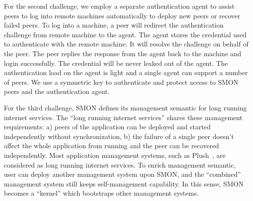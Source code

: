 
For the second challenge, we employ a separate
authentication agent to assist peers to log into remote
machines automatically to deploy new peers or recover failed
peers. To log into a machine, a peer will redirect the
authentication challenge from remote machine to the agent.
The agent stores the credential used to authenticate with
the remote machine. It will resolve the challenge on behalf
of the peer. The peer replies the response from the agent
back to the machine and login successfully. The credential
will be never leaked out of the agent. The authentication
load on the agent is light and a single agent can support a
number of peers.  We use a symmetric key to authenticate and
protect access to SMON peers and the authentication agent.

For the third challenge, SMON defines its management
semantic for long running internet services. The ``long
running internet services'' shares these management
requirements: a) peers of the application can be deployed
and started independently without synchronization, b) the
failure of a single peer doesn't affect the whole
application from running and the peer can be recovered
independently.
Most application management systems, such as
Plush~\cite{Albrecht2007},
are considered as long running internet services. To enrich
management semantic, user can deploy another management
system upon SMON, and the ``combined'' management system
still keeps self-management capability. In this sense, SMON
becomes a ``kernel'' which bootstraps other management
systems.


